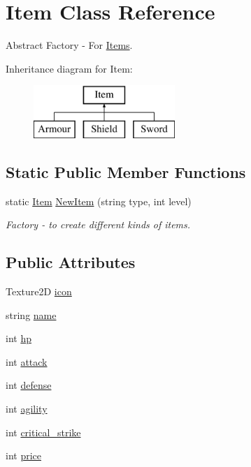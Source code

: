 \hypertarget{class_item}{}\section{Item Class Reference}
\label{class_item}


Abstract Factory -\/ For \mbox{\hyperlink{class_items}{Items}}.  


Inheritance diagram for Item\+:\begin{figure}[H]
\begin{center}
\leavevmode
\includegraphics[height=2.000000cm]{class_item}
\end{center}
\end{figure}
\subsection*{Static Public Member Functions}
\begin{DoxyCompactItemize}
\item 
static \mbox{\hyperlink{class_item}{Item}} \mbox{\hyperlink{class_item_ab8f02ecfdb0e7333b423635cccaac0ee}{New\+Item}} (string type, int level)
\begin{DoxyCompactList}\small\item\em Factory -\/ to create different kinds of items. \end{DoxyCompactList}\end{DoxyCompactItemize}
\subsection*{Public Attributes}
\begin{DoxyCompactItemize}
\item 
Texture2D \mbox{\hyperlink{class_item_aa27b80bec704f77f3b1a5f00ff9120ea}{icon}}
\item 
string \mbox{\hyperlink{class_item_a86a80b030e63ac2d31f3576ed8d1be51}{name}}
\item 
int \mbox{\hyperlink{class_item_a8ac358b3db5252f0f4cef2422e301fe4}{hp}}
\item 
int \mbox{\hyperlink{class_item_a3ce7a0eeab152f61639403838f05f0cc}{attack}}
\item 
int \mbox{\hyperlink{class_item_af408dfdaffd7c3e1920615c9ad124079}{defense}}
\item 
int \mbox{\hyperlink{class_item_a0fcb0d0a27623f05cfb0e2ac06135d86}{agility}}
\item 
int \mbox{\hyperlink{class_item_a925e7d3f5b5ad9195d17e4db303f86f1}{critical\+\_\+strike}}
\item 
int \mbox{\hyperlink{class_item_a371a0aed2415a1b8adf020707a38ab76}{price}}
\end{DoxyCompactItemize}
